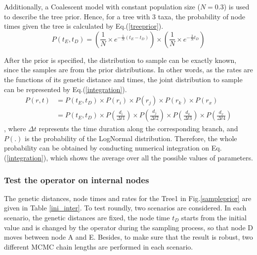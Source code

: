 \documentclass{bmcart}
\begin{document}
Additionally, a Coalescent model with constant population size ($N=0.3$) is used to describe the tree prior. Hence, for a tree with 3 taxa, the probability of node times given the tree is calculated by Eq.(\ref{treeprior}).
\begin{equation}\label{treeprior}
P({t_E},{t_D}) = (\frac{1}{N} \times {e^{ - \frac{1}{N}({t_E} - {t_D})}}) \times (\frac{1}{N} \times {e^{ - \frac{3}{N}{t_D}}})
\end{equation}

After the prior is specified, the distribution to sample can be exactly known, since the samples are from the prior distributions. In other words, as the rates are the functions of its genetic distance and times, the joint distribution to sample can be represented by Eq.(\ref{integration}).
\begin{equation}\label{integration}
\begin{aligned}
P(r,t) &= P({t_E},{t_D}) \times P({r_i}) \times P({r_j}) \times P({r_k}) \times P({r_x}) \\&= P({t_E},{t_D}) \times P(\frac{{{d_i}}}{{\Delta t1}}) \times P(\frac{{{d_j}}}{{\Delta t2}}) \times P(\frac{{{d_k}}}{{\Delta t3}}) \times P(\frac{{{d_x}}}{{\Delta t4}})
\end{aligned}
\end{equation}
, where ${\Delta t}$ represents the time duration along the corresponding branch, and $P({.})$ is the probability of the LogNormal distribution. Therefore, the whole probability can be obtained by conducting numerical integration on Eq.(\ref{integration}), which shows the average over all the possible values of parameters. 
\subsubsection*{Test the operator on internal nodes}
The genetic distances, node times and rates for the Tree1 in Fig.\ref{sampleprior} are given in Table \ref{ini_inter}. To test roundly, two scenarios are considered. In each scenario, the genetic distances are fixed, the node time $t_D$ starts from the initial value and is changed by the operator during the sampling process, so that node D moves between node A and E. Besides, to make sure that the result is robust, two different MCMC chain lengths are performed in each scenario. 
\end{document}
